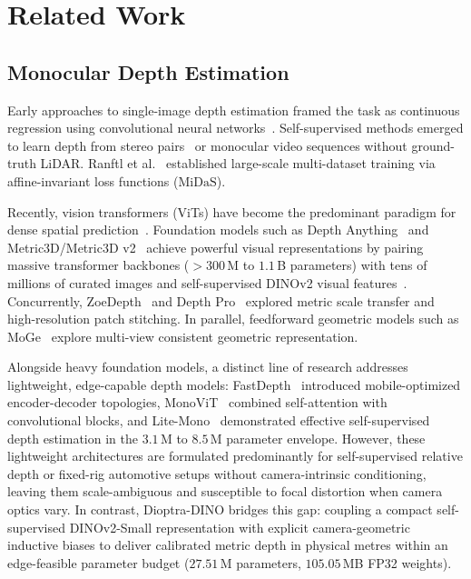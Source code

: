 \section{Related Work}
\label{sec:related_work}

\subsection{Monocular Depth Estimation}
Early approaches to single-image depth estimation framed the task as continuous regression using convolutional neural networks~\cite{eigen2014depth}. Self-supervised methods emerged to learn depth from stereo pairs~\cite{godard2019digging} or monocular video sequences without ground-truth LiDAR. Ranftl et al.~\cite{ranftl2020towards} established large-scale multi-dataset training via affine-invariant loss functions ($\text{MiDaS}$). 

Recently, vision transformers (ViTs) have become the predominant paradigm for dense spatial prediction~\cite{ranftl2021vision,bhat2021adabins}. Foundation models such as Depth Anything~\cite{yang2024depth,yang2024depth2} and Metric3D/Metric3D v2~\cite{yin2023metric3d,yin2024metric3dv2} achieve powerful visual representations by pairing massive transformer backbones ($>300$\,M to $1.1$\,B parameters) with tens of millions of curated images and self-supervised DINOv2 visual features~\cite{oquab2023dinov2}. Concurrently, ZoeDepth~\cite{bhat2023zoedepth} and Depth Pro~\cite{bochkovskiy2024depthpro} explored metric scale transfer and high-resolution patch stitching. In parallel, feedforward geometric models such as MoGe~\cite{wang2024moge} explore multi-view consistent geometric representation. 

Alongside heavy foundation models, a distinct line of research addresses lightweight, edge-capable depth models: FastDepth~\cite{wofk2019fastdepth} introduced mobile-optimized encoder-decoder topologies, MonoViT~\cite{zhao2022monovit} combined self-attention with convolutional blocks, and Lite-Mono~\cite{zhang2023litemono} demonstrated effective self-supervised depth estimation in the $3.1$\,M to $8.5$\,M parameter envelope. However, these lightweight architectures are formulated predominantly for self-supervised relative depth or fixed-rig automotive setups without camera-intrinsic conditioning, leaving them scale-ambiguous and susceptible to focal distortion when camera optics vary. In contrast, Dioptra-DINO bridges this gap: coupling a compact self-supervised DINOv2-Small representation with explicit camera-geometric inductive biases to deliver calibrated metric depth in physical metres within an edge-feasible parameter budget ($27.51$\,M parameters, $105.05$\,MB FP32 weights).

